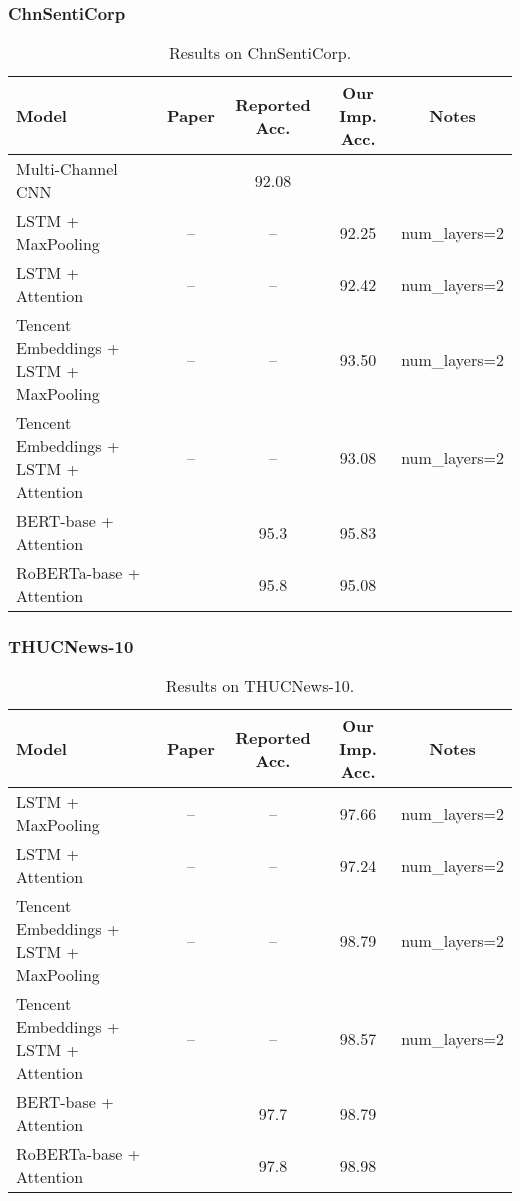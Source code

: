 \documentclass{article}
\begin{document}
\subsubsection{ChnSentiCorp}
\begin{table}[H]
    \centering
    \begin{tabular}{lcccc}
    \toprule
    Model & Paper & Reported Acc. & Our Imp. Acc. & Notes \\
    \midrule
    Multi-Channel CNN                      & \citet{liu2018exploiting}  & 92.08 \\
    LSTM + MaxPooling                      & --                         & --    & 92.25 & num\_layers=2 \\
    LSTM + Attention                       & --                         & --    & 92.42 & num\_layers=2 \\
    Tencent Embeddings + LSTM + MaxPooling & --                         & --    & 93.50 & num\_layers=2 \\
    Tencent Embeddings + LSTM + Attention  & --                         & --    & 93.08 & num\_layers=2 \\
    BERT-base + Attention                  & \citet{cui2019pretraining} & 95.3  & 95.83 \\
    RoBERTa-base + Attention               & \citet{cui2019pretraining} & 95.8  & 95.08 \\
    \bottomrule
    \end{tabular}
    \caption{Results on ChnSentiCorp.} 
\end{table}

\subsubsection{THUCNews-10}
\begin{table}[H]
    \centering
    \begin{tabular}{lcccc}
    \toprule
    Model & Paper & Reported Acc. & Our Imp. Acc. & Notes \\
    \midrule
    LSTM + MaxPooling                      & --                         & --    & 97.66 & num\_layers=2 \\
    LSTM + Attention                       & --                         & --    & 97.24 & num\_layers=2 \\
    Tencent Embeddings + LSTM + MaxPooling & --                         & --    & 98.79 & num\_layers=2 \\
    Tencent Embeddings + LSTM + Attention  & --                         & --    & 98.57 & num\_layers=2 \\
    BERT-base + Attention                  & \citet{cui2019pretraining} & 97.7  & 98.79 \\
    RoBERTa-base + Attention               & \citet{cui2019pretraining} & 97.8  & 98.98 \\
    \bottomrule
    \end{tabular}
    \caption{Results on THUCNews-10.} 
\end{table}


\newpage

 
\end{document}
